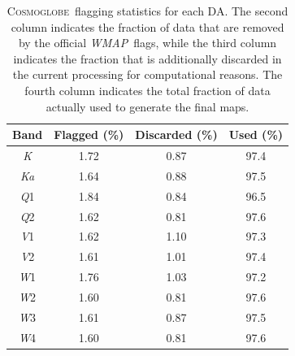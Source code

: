 \documentclass[twocolumn]{../../common/aa}
\def\WMAP{\emph{WMAP}}
\newcommand{\cosmoglobe}{\textsc{Cosmoglobe}}
\newcommand{\K}[0]{\textit K}
\newcommand{\Ka}[0]{\textit{Ka}}
\newcommand{\Q}[0]{\textit Q}
\newcommand{\V}[0]{\textit V}
\newcommand{\W}[0]{\textit W}
\begin{document}
\begin{table}
\caption{\cosmoglobe\ flagging statistics for each DA. The second column indicates the fraction of data that are removed by the official \WMAP\ flags, while the third column indicates the fraction that is additionally discarded in the current processing for computational reasons. The fourth column indicates the total fraction of data actually used to generate the final maps. }              %
\label{table:flagged_data}      %
\centering                                      %
\begin{tabular}{c c c c}          %
\hline\hline                        %
	Band & Flagged (\%) & Discarded (\%) & Used (\%) \\    %
\hline                                   %
	\K  &  1.72 & 0.87 & 97.4\\
	\Ka &  1.64 & 0.88 & 97.5\\      %
	\Q1 &  1.84 & 0.84 & 96.5\\
	\Q2 &  1.62 & 0.81 & 97.6\\
	\V1 &  1.62 & 1.10 & 97.3\\
	\V2 &  1.61 & 1.01 & 97.4\\
	\W1 &  1.76 & 1.03 & 97.2\\
	\W2 &  1.60 & 0.81 & 97.6\\
	\W3 &  1.61 & 0.87 & 97.5\\
	\W4 &  1.60 & 0.81 & 97.6\\
\hline                                             %
\end{tabular}
\end{table}
\end{document}
